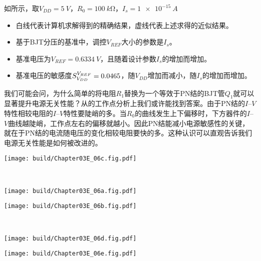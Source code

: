 如所示，取$V_{DD}=\SI{5}{V}$，$R_0=\SI{100}{k\ohm}$，$I_s=\SI{1e-15}{A}$
\begin{itemize}
    \item 白线代表计算机求解得到的精确结果，虚线代表上述求得的近似结果。
    \item 基于BJT分压的基准中，调控$V_{REF}$大小的参数是$I_s$。
    \item 基准电压为$V_{REF}=\SI{0.6334}{V}$，且随着设计参数$I_s$的增加而增加。
    \item 基准电压的敏感度$S_{V_{DD}}^{V_{REF}}=0.0465$，随$V_{DD}$增加而减小，随$I_s$的增加而增加。
\end{itemize}
我们可能会问，为什么简单的将电阻$R_1$替换为一个等效于PN结的BJT管$Q_1$就可以显著提升电源无关性能？从的工作点分析上我们或许能找到答案。由于PN结的$I$--$V$特性相较电阻的$I$--$V$特性要陡峭的多。当$R_0$的曲线发生上下偏移时，下方器件的$I$--$V$曲线越陡峭，工作点左右的偏移就越小。因此PN结能减小电源敏感性的关键，就在于PN结的电流随电压的变化相较电阻要快的多。这种认识可以直观告诉我们电源无关性能是如何被改进的。

\begin{Figure}[基于BJT分压的基准--特性]
    \begin{FigureSub}
        \texttt{[image: build/Chapter03E\_06c.fig.pdf]}
    \end{FigureSub}\\ \vspace{0.5cm}
    \begin{FigureSub}
        \texttt{[image: build/Chapter03E\_06a.fig.pdf]}
    \end{FigureSub}
    \begin{FigureSub}
        \texttt{[image: build/Chapter03E\_06b.fig.pdf]}
    \end{FigureSub}\\ \vspace{0.5cm}
    \begin{FigureSub}
        \texttt{[image: build/Chapter03E\_06d.fig.pdf]}
    \end{FigureSub}
    \begin{FigureSub}
        \texttt{[image: build/Chapter03E\_06e.fig.pdf]}
    \end{FigureSub}
\end{Figure}

